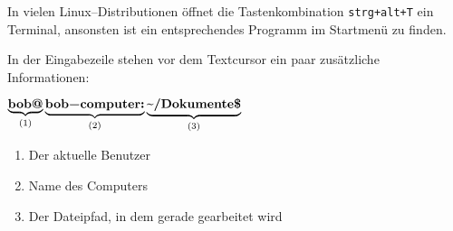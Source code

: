 In vielen Linux--Distributionen öffnet die Tastenkombination \lstinline$strg+alt+T$ ein Terminal, ansonsten ist ein entsprechendes Programm im Startmenü zu finden.

In der Eingabezeile stehen vor dem Textcursor ein paar zusätzliche Informationen:

\( \underbrace{\textbf{\lstinline|bob@|}}_{(1)}\underbrace{\textbf{\lstinline|bob-computer:|}}_{(2)}\underbrace{\textbf{\textapprox\lstinline|/Dokumente$|}}_{(3)} \)

\begin{enumerate}
\item Der aktuelle Benutzer
\item Name des Computers
\item Der Dateipfad, in dem gerade gearbeitet wird
\end{enumerate}

